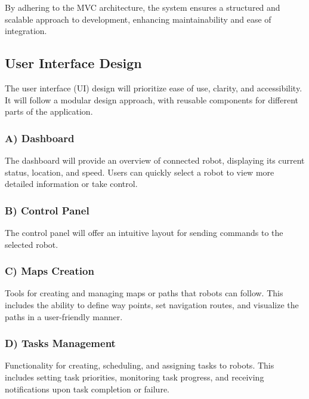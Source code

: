 By adhering to the MVC architecture, the system ensures a structured and scalable approach to development, enhancing maintainability and ease of integration.
\subsection{User Interface Design}
\vspace{-1.5mm}
The user interface (UI) design will prioritize ease of use, clarity, and accessibility. It will follow a modular design approach, with reusable components for different parts of the application.
\vspace{-1.5mm}

\subsubsection{A) Dashboard}
\vspace{-1mm}
The dashboard will provide an overview of connected robot, displaying its current status, location, and speed. Users can quickly select a robot to view more detailed information or take control.
\vspace{-1mm}
\subsubsection{B) Control Panel}
\vspace{-1mm}
The control panel will offer an intuitive layout for sending commands to the selected robot.
\vspace{-5mm}
\subsubsection{C) Maps Creation}
\vspace{-1mm}
Tools for creating and managing maps or paths that robots can follow. This includes the ability to define way points, set navigation routes, and visualize the paths in a user-friendly manner.
\newpage
\subsubsection{D) Tasks Management}
\vspace{-1mm}
 Functionality for creating, scheduling, and assigning tasks to robots. This includes setting task priorities, monitoring task progress, and receiving notifications upon task completion or failure.
\vspace{-1mm}
